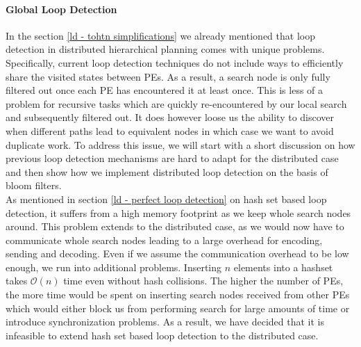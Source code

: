 \paragraph{Global Loop Detection}
\label{ld - global}
In the section \ref{ld - tohtn simplifications} we already mentioned that loop detection in distributed hierarchical planning comes with unique problems. Specifically, current loop detection techniques do not include ways to efficiently share the visited states between PEs. As a result, a search node is only fully filtered out once each PE has encountered it at least once. This is less of a problem for recursive tasks which are quickly re-encountered by our local search and subsequently filtered out. It does however loose us the ability to discover when different paths lead to equivalent nodes in which case we want to avoid duplicate work. To address this issue, we will start with a short discussion on how previous loop detection mechanisms are hard to adapt for the distributed case and then show how we implement distributed loop detection on the basis of bloom filters. \\
As mentioned in section \ref{ld - perfect loop detection} on hash set based loop detection, it suffers from a high memory footprint as we keep whole search nodes around. This problem extends to the distributed case, as we would now have to communicate whole search nodes leading to a large overhead for encoding, sending and decoding. Even if we assume the communication overhead to be low enough, we run into additional problems. Inserting $n$ elements into a hashset takes $\mathcal{O}(n)$ time even without hash collisions. The higher the number of PEs, the more time would be spent on inserting search nodes received from other PEs which would either block us from performing search for large amounts of time or introduce synchronization problems. As a result, we have decided that it is infeasible to extend hash set based loop detection to the distributed case. \\
\begin{comment}
- insertion of $n$ search nodes is expensive
- encoding and decoding becomes more difficult, especially


- previous section \ref{ld - tohtn simplifications} mentions that distributed planning makes loop detection less efficient
- recursion is still fine
- different paths leading to equivalent nodes are no longer detected

- normal loop detection gets worse in distributed (TO)HTN planning
- each worker tracks it's own set of known nodes
- if worker $w_1$ encounters a node, workers $w_2, \ldots, w_n$ will not filter that node out until they've encountered it themselves at least once

- we try to find a way to perform global loop detection
\end{comment}
